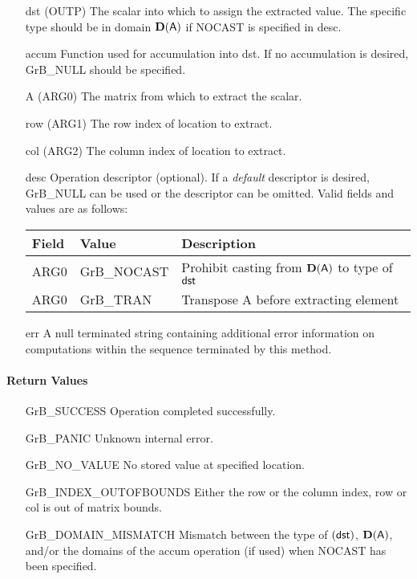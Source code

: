 \begin{itemize}[leftmargin=1in]
    \item[{\sf dst}]   ({\sf OUTP}) The scalar into which to assign the extracted value.  The specific type should be in domain $\bold{D}({\sf A})$ if {\sf NOCAST} is specified in {\sf desc}.
    \item[{\sf accum}] Function used for accumulation into dst. If no accumulation is desired,
                        {\sf GrB\_NULL} should be specified.
    \item[{\sf A}]   ({\sf ARG0}) The matrix from which to extract the scalar.
    \item[{\sf row}]     ({\sf ARG1}) The row index of location to extract.
    \item[{\sf col}]     ({\sf ARG2}) The column index of location to extract.

    \item[{\sf desc}]   Operation descriptor (optional). If a
    \emph{default} descriptor is desired, {\sf GrB\_NULL} can be
    used or the descriptor can be omitted.  Valid fields and values are as follows: \\
    \begin{tabular}{lll}
    Field  & Value & Description \\
    \hline
    {\sf ARG0} & {\sf GrB\_NOCAST} & Prohibit casting from $\bold{D}({\sf A})$ to type of ${\sf dst}$ \\
    {\sf ARG0} & {\sf GrB\_TRAN} &  Transpose {\sf A} before extracting element \\
    \end{tabular}
    \item[{\sf err}]     A null terminated string containing additional error
                         information on computations within the sequence 
                         terminated by this method. 

\end{itemize}

\paragraph{Return Values}

\begin{itemize}[leftmargin=2.1in]
\item[{\sf GrB\_SUCCESS}]          Operation completed successfully.
\item[{\sf GrB\_PANIC}]            Unknown internal error.
\item[{\sf GrB\_NO\_VALUE}]        No stored value at specified location.
\item[{\sf GrB\_INDEX\_OUTOFBOUNDS}]  Either the row or the column index,
                                      {\sf row} or {\sf col} is out of matrix bounds.
\item[{\sf GrB\_DOMAIN\_MISMATCH}]    Mismatch between the type of $(\sf dst)$, 
                                      $\bold{D}({\sf A})$, and/or the domains of the 
                                      {\sf accum} operation (if used) when {\sf NOCAST} has
                                      been specified.
\end{itemize}

